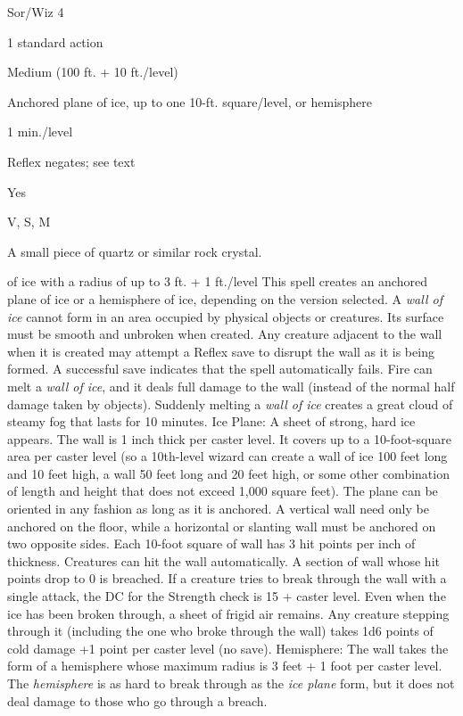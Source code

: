 
\begin{description*}
\item[Level:] Sor/Wiz 4
\item[Casting Time:] 1 standard action
\item[Range:] Medium (100 ft. + 10 ft./level)
\item[Effect:] Anchored plane of ice, up to one 10-ft. square/level, or hemisphere
\item[Duration:] 1 min./level
\item[Saving Throw:] Reflex negates; see text
\item[Spell Resistance:] Yes
\item[Components:] V, S, M
\item[Arcane Material Component:] A small piece of quartz or similar rock crystal.
\end{description*}

of ice with a radius of up to 3 ft. + 1 ft./level
This spell creates an anchored plane of ice or a hemisphere of ice, depending on
the version selected. A \textit{wall of ice} cannot form in an area occupied by
physical objects or creatures. Its surface must be smooth and unbroken when created.
Any creature adjacent to the wall when it is created may attempt a Reflex save
to disrupt the wall as it is being formed. A successful save indicates that the
spell automatically fails. Fire can melt a \textit{wall of ice}, and it deals full
damage to the wall (instead of the normal half damage taken by objects). Suddenly
melting a \textit{wall of ice} creates a great cloud of steamy fog that lasts for
10 minutes.
Ice Plane: A sheet of strong, hard ice appears. The wall is 1 inch thick
per caster level. It covers up to a 10-foot-square area per caster level (so a
10th-level wizard can create a wall of ice 100 feet long and 10 feet high, a wall
50 feet long and 20 feet high, or some other combination of length and height that
does not exceed 1,000 square feet). The plane can be oriented in any fashion as
long as it is anchored. A vertical wall need only be anchored on the floor, while
a horizontal or slanting wall must be anchored on two opposite sides.
Each 10-foot square of wall has 3 hit points per inch of thickness. Creatures can
hit the wall automatically. A section of wall whose hit points drop to 0 is breached.
If a creature tries to break through the wall with a single attack, the DC for
the Strength check is 15 + caster level.
Even when the ice has been broken through, a sheet of frigid air remains. Any creature
stepping through it (including the one who broke through the wall) takes 1d6 points
of cold damage +1 point per caster level (no save).
Hemisphere: The wall takes the form of a hemisphere whose maximum radius
is 3 feet + 1 foot per caster level. The \textit{hemisphere} is as hard to break
through as the \textit{ice plane} form, but it does not deal damage to those who
go through a breach.